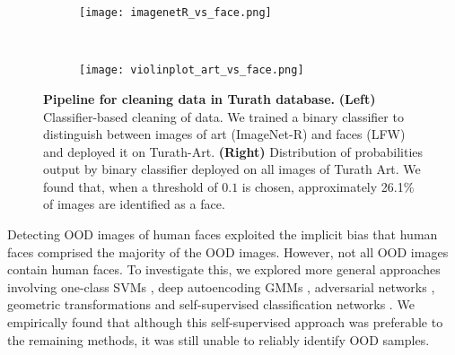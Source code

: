 \documentclass{article}
\begin{document}

\begin{figure}[!t]
    \centering
    \begin{subfigure}{0.55\textwidth}
    \centering
    \texttt{[image: imagenetR\_vs\_face.png]}
    \end{subfigure}
    ~
    \begin{subfigure}{0.4\textwidth}
    \centering
    \texttt{[image: violinplot\_art\_vs\_face.png]}
    \end{subfigure}
    \caption{\textbf{Pipeline for cleaning data in Turath database.} \textbf{(Left)} Classifier-based cleaning of data. We trained a binary classifier to distinguish between images of art (ImageNet-R) and faces (LFW) and deployed it on Turath-Art. \textbf{(Right)} Distribution of probabilities output by binary classifier deployed on all images of Turath Art. We found that, when a threshold of $0.1$ is chosen, approximately 26.1\% of images are identified as a face.}
    \label{fig:art_vs_faces}
\end{figure}

Detecting OOD images of human faces exploited the implicit bias that human faces comprised the majority of the OOD images. However, not all OOD images contain human faces. To investigate this, we explored more general approaches involving one-class SVMs \cite{erfani2016high}, deep autoencoding GMMs \cite{zong2018deep}, adversarial networks \cite{li2018anomaly}, geometric transformations \cite{golan2018deep} and self-supervised classification networks \cite{amrani2021self}. We empirically found that although this self-supervised approach was preferable to the remaining methods, it was still unable to reliably identify OOD samples.

\end{document}
